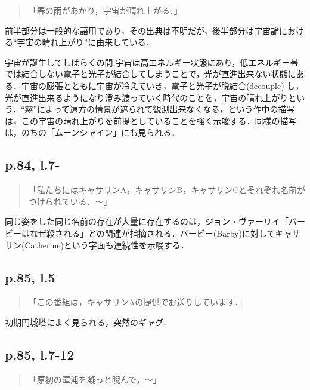 \documentclass[10pt, a5paper, twoside]{ltjsarticle}
\begin{document}
            \begin{quote}
                「春の雨があがり，宇宙が晴れ上がる．」
            \end{quote}

            前半部分は一般的な語用であり，その出典は不明だが，後半部分は宇宙論における“宇宙の晴れ上がり”に由来している．

            宇宙が誕生してしばらくの間,宇宙は高エネルギー状態にあり，低エネルギー帯では結合しない電子と光子が結合してしまうことで，光が直進出来ない状態にある．宇宙の膨張とともに宇宙が冷えていき，電子と光子が脱結合(decouple) し，光が直進出来るようになり澄み渡っていく時代のことを，宇宙の晴れ上がりという．“霧”によって遠方の情景が遮られて観測出来なくなる，という作中の描写は，この宇宙の晴れ上がりを前提としていることを強く示唆する．同様の描写は，のちの「ムーンシャイン」にも見られる．

        \subsection{p.84, l.7-}

            \begin{quote}
                「私たちにはキャサリンA，キャサリンB，キャサリンCとそれぞれ名前がつけられている．〜」
            \end{quote}

            同じ姿をした同じ名前の存在が大量に存在するのは，ジョン・ヴァーリイ「バービーはなぜ殺される」との関連が指摘される．バービー(Barby)に対してキャサリン(Catherine)という字面も連続性を示唆する．

        \subsection{p.85, l.5}

            \begin{quote}
                「この番組は，キャサリンAの提供でお送りしています．」
            \end{quote}

            初期円城塔によく見られる，突然のギャグ．

        \subsection{p.85, l.7-12}

            \begin{quote}
                「原初の渾沌を凝っと睨んで，〜」
            \end{quote}
\end{document}
